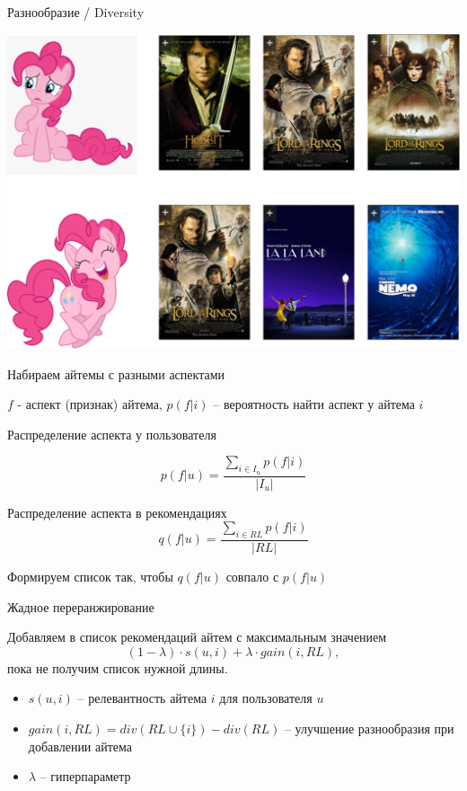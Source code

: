 \documentclass[11pt,aspectratio=169,handout]{beamer}
\begin{document}
\begin{frame}{Разнообразие / Diversity}

\begin{center}
\includegraphics[scale=0.22]{images/diversity.png}
\end{center}

\end{frame}

\begin{frame}{Набираем айтемы с разными аспектами}

$f$ - аспект (признак) айтема, $p(f | i)$ -- вероятность найти аспект у айтема $i$

\vfill

Распределение аспекта у пользователя

\[
p(f | u) = \frac{\sum_{i \in I_u} p(f | i)}{|I_u|}  
\]

Распределение аспекта в рекомендациях
\[
q(f | u) = \frac{\sum_{i \in RL} p(f | i)}{|RL|}
\]

\begin{tcolorbox}[colback=info!5,colframe=info!80,title=]
Формируем список так, чтобы $q(f | u)$ совпало с $p(f | u)$
\end{tcolorbox}

\end{frame}

\begin{frame}{Жадное переранжирование}

\begin{tcolorbox}[colback=info!5,colframe=info!80,title=]
Добавляем в список рекомендаций айтем с максимальным значением
\[
(1 - \lambda) \cdot s(u, i) + \lambda \cdot gain(i, RL),
\]
пока не получим список нужной длины.
\end{tcolorbox}

\vfill

\begin{itemize}
\item $s(u, i)$ -- релевантность айтема $i$ для пользователя $u$ 
\item $gain(i, RL) = div(RL \cup \{i\}) - div(RL)$ -- улучшение разнообразия при добавлении айтема
\item $\lambda$ -- гиперпараметр
\end{itemize}

\end{frame}
\end{document}
